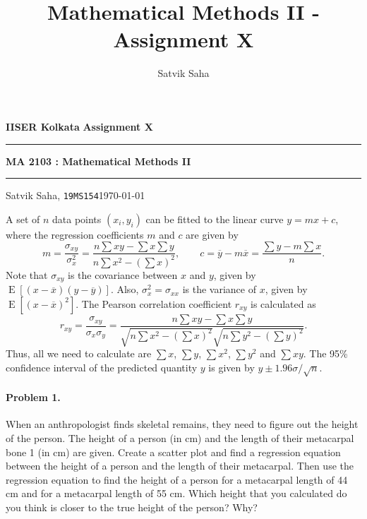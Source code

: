 \documentclass[10pt]{article}
\title{Mathematical Methods II - Assignment X}
\author{Satvik Saha}
\date{}
\newcommand\E[1]{\operatorname{E}[#1]}
\begin{document}
        \par\textbf{IISER Kolkata} \hfill \textbf{Assignment X}
        \vspace{3pt}
        \hrule
        \vspace{3pt}
        \begin{center}
                \LARGE{\textbf{MA 2103 : Mathematical Methods II}}
        \end{center}
        \vspace{3pt}
        \hrule
        \vspace{3pt}
        Satvik Saha, \texttt{19MS154}\hfill\today
        \vspace{20pt}

        A set of $n$ data points $(x_i, y_i)$ can be fitted to the linear curve $y = mx + c$, where the regression coefficients $m$ and $c$
        are given by
        \[
                m = \frac{\sigma_{xy}}{\sigma_{x}^2} = \frac{n\sum xy - \sum x\sum y}{n\sum x^2 - (\sum x)^2}, \qquad
                c = \overline{y} - m\overline{x} = \frac{\sum y - m\sum{x}}{n}.
        \]
        Note that $\sigma_{xy}$ is the covariance between $x$ and $y$, given by $\E{(x - \overline{x})(y - \overline{y})}$.
        Also, $\sigma_x^2 = \sigma_{xx}$ is the variance of $x$, given by $\E{(x - \overline{x})^2}$.
        The Pearson correlation coefficient $r_{xy}$ is calculated as
        \[
                r_{xy} = \frac{\sigma_{xy}}{\sigma_x\sigma_y} 
                        = \frac{n\sum xy - \sum x\sum y}{\sqrt{n\sum x^2 - (\sum x)^2}\sqrt{n\sum y^2 - (\sum y)^2}}.
        \]
        Thus, all we need to calculate are $\sum x$, $\sum y$, $\sum x^2$, $\sum y^2$ and $\sum xy$.
        The 95\% confidence interval of the predicted quantity $y$ is given by $y \pm 1.96 \sigma /\sqrt{n}$.

        \paragraph{Problem 1.} When an anthropologist finds skeletal remains, they need to figure out the height of the person.
        The height of a person (in cm) and the length of their metacarpal bone 1 (in cm) are given. Create a scatter plot and
        find a regression equation between the height of a person and the length of their metacarpal. Then use the regression equation to
        find the height of a person for a metacarpal length of 44 cm and for a metacarpal length of 55 cm.
        Which height that you calculated do you think is closer to the true height of the person? Why? \\
\end{document}
